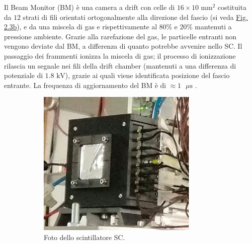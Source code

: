 \documentclass[12pt,a4paper,twoside]{report}
\begin{document}
	Il Beam Monitor (BM) è una camera a drift con celle di $16\times10\mbox{ mm}^2$ costituita da $12$ strati di fili orientati ortogonalmente alla direzione del fascio (si veda \hyperref[fig:beam_monitor]{Fig. 2.3b}), e da una miscela di gas  e  rispettivamente al $80\%$ e $20\%$ mantenuti a pressione ambiente. Grazie alla rarefazione del gas, le particelle entranti non vengono deviate dal BM, a differenza di quanto potrebbe avvenire nello SC. Il passaggio dei frammenti ionizza la miscela di gas; il processo di ionizzazione rilascia un segnale nei fili della drift chamber (mantenuti a una differenza di potenziale di $1.8\mbox{ kV}$), grazie ai quali viene identificata posizione del fascio entrante. La frequenza di aggiornamento del BM è di $\approx1\mbox{ }\mu\mbox{s}$ \cite{foot_cdr,ubaldiArticle}.
	\begin{figure}[H]
		\centering
		\begin{subfigure}[t]{0.49\textwidth}
			\centering
			\includegraphics[width=\textwidth, scale=0.5]{2_STreal.png}
			\caption{Foto dello scintillatore SC.}
			\label{fig:start_counter}
		\end{subfigure}
		\hfill
		\begin{subfigure}[t]{0.49\textwidth}
			\centering

\end{subfigure}
\end{figure}
\end{document}

